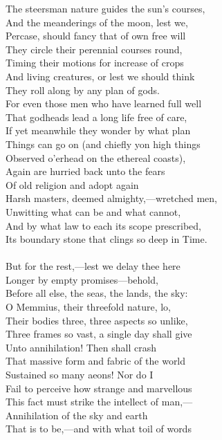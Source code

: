 The steersman nature guides the sun's courses,\\
And the meanderings of the moon, lest we,\\
Percase, should fancy that of own free will\\
They circle their perennial courses round,\\
Timing their motions for increase of crops\\
And living creatures, or lest we should think\\
They roll along by any plan of gods.\\
For even those men who have learned full well\\
That godheads lead a long life free of care,\\
If yet meanwhile they wonder by what plan\\
Things can go on (and chiefly yon high things\\
Observed o'erhead on the ethereal coasts),\\
Again are hurried back unto the fears\\
Of old religion and adopt again\\
Harsh masters, deemed almighty,—wretched men,\\
Unwitting what can be and what cannot,\\
And by what law to each its scope prescribed,\\
Its boundary stone that clings so deep in Time.\\
\\
But for the rest,—lest we delay thee here\\
Longer by empty promises—behold,\\
Before all else, the seas, the lands, the sky:\\
O Memmius, their threefold nature, lo,\\
Their bodies three, three aspects so unlike,\\
Three frames so vast, a single day shall give\\
Unto annihilation! Then shall crash\\
That massive form and fabric of the world\\
Sustained so many aeons! Nor do I\\
Fail to perceive how strange and marvellous\\
This fact must strike the intellect of man,—\\
Annihilation of the sky and earth\\
That is to be,—and with what toil of words\\
